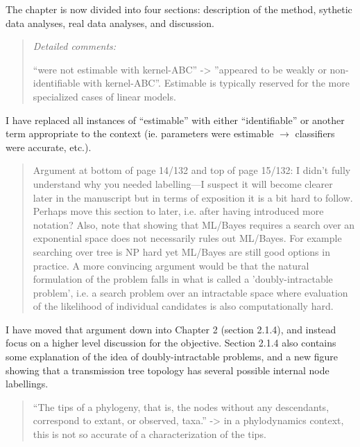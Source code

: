 \documentclass[12pt]{article}
\begin{document}
The chapter is now divided into four sections: description of the method,
sythetic data analyses, real data analyses, and discussion.

\begin{quote}
  \itshape
  Detailed comments:

  ``were not estimable with kernel-ABC'' -> ''appeared to be weakly or
  non-identifiable with kernel-ABC''. Estimable is typically reserved for the
  more specialized cases of linear models.
\end{quote}

I have replaced all instances of ``estimable'' with either ``identifiable'' or
another term appropriate to the context (ie. parameters were estimable $\to$
classifiers were accurate, etc.).

\begin{quote}
  \itshape

  Argument at bottom of page 14/132 and top of page 15/132: I didn't fully
  understand why you needed labelling---I suspect it will become clearer later
  in the manuscript but in terms of exposition it is a bit hard to follow.
  Perhaps move this section to later, i.e. after having introduced more
  notation? Also, note that showing that ML/Bayes requires a search over an
  exponential space does not necessarily rules out ML/Bayes. For example
  searching over tree is NP hard yet ML/Bayes are still good options in
  practice. A more convincing argument would be that the natural formulation of
  the problem falls in what is called a 'doubly-intractable problem', i.e. a
  search problem over an intractable space where evaluation of the likelihood
  of individual candidates is also computationally hard.
\end{quote}

I have moved that argument down into Chapter 2 (section 2.1.4), and instead
focus on a higher level discussion for the objective. Section 2.1.4 also
contains some explanation of the idea of doubly-intractable problems, and a new
figure showing that a transmission tree topology has several possible internal
node labellings.

\begin{quote}
  \itshape

  ``The tips of a phylogeny, that is, the nodes without any descendants,
  correspond to extant, or observed, taxa.'' -> in a phylodynamics context,
  this is not so accurate of a characterization of the tips.
\end{quote}
\end{document}
